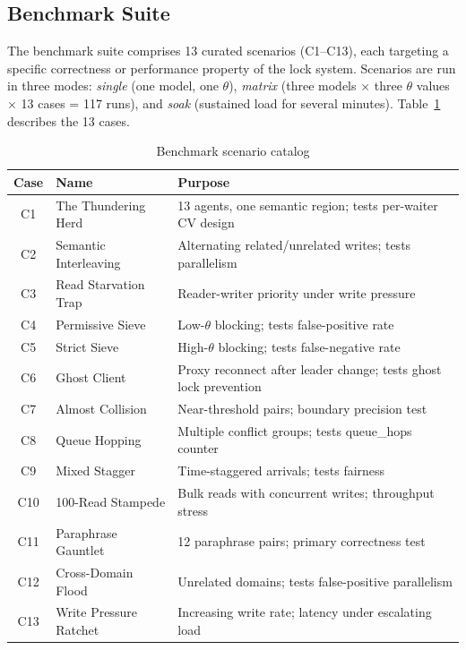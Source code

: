 \documentclass[sigconf]{acmart}
\begin{document}
\subsection{Benchmark Suite}
\label{sec:benchmark-suite}

The benchmark suite comprises 13 curated scenarios (C1--C13), each targeting a specific
correctness or performance property of the lock system. Scenarios are run in three
modes: \emph{single} (one model, one $\theta$), \emph{matrix} (three models $\times$
three $\theta$ values $\times$ 13 cases = 117 runs), and \emph{soak} (sustained load for
several minutes). Table~\ref{tab:cases} describes the 13 cases.

\begin{table}[t]
  \centering
  \caption{Benchmark scenario catalog}
  \label{tab:cases}
  \scriptsize
  \begin{tabular}{@{}clp{3.5cm}@{}}
    \toprule
    Case & Name & Purpose \\
    \midrule
    C1  & The Thundering Herd           & 13 agents, one semantic region; tests per-waiter CV design \\
    C2  & Semantic Interleaving         & Alternating related/unrelated writes; tests parallelism \\
    C3  & Read Starvation Trap          & Reader-writer priority under write pressure \\
    C4  & Permissive Sieve              & Low-$\theta$ blocking; tests false-positive rate \\
    C5  & Strict Sieve                  & High-$\theta$ blocking; tests false-negative rate \\
    C6  & Ghost Client                  & Proxy reconnect after leader change; tests ghost lock prevention \\
    C7  & Almost Collision              & Near-threshold pairs; boundary precision test \\
    C8  & Queue Hopping                 & Multiple conflict groups; tests queue\_hops counter \\
    C9  & Mixed Stagger                 & Time-staggered arrivals; tests fairness \\
    C10 & 100-Read Stampede             & Bulk reads with concurrent writes; throughput stress \\
    C11 & Paraphrase Gauntlet           & 12 paraphrase pairs; primary correctness test \\
    C12 & Cross-Domain Flood            & Unrelated domains; tests false-positive parallelism \\
    C13 & Write Pressure Ratchet        & Increasing write rate; latency under escalating load \\
    \bottomrule
  \end{tabular}
\end{table}
\end{document}
